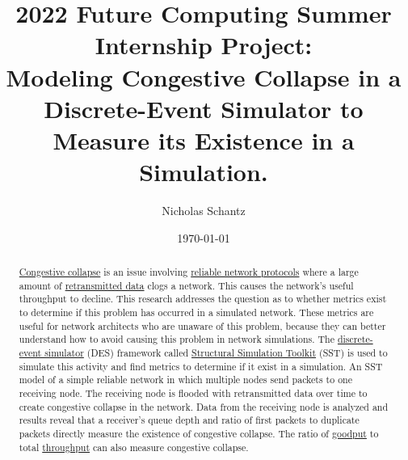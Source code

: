 \documentclass{article}
\begin{document}
    \begin{minipage}[h]{\textwidth}
        \title{2022 Future Computing Summer Internship Project:\\Modeling Congestive Collapse in a Discrete-Event Simulator to Measure its Existence in a Simulation.}
        \author{Nicholas Schantz}
        \date{\today}
            \maketitle
        \begin{abstract}
            \href{https://en.wikipedia.org/wiki/Network_congestion#Congestive_collapse}{Congestive collapse} is an issue involving \href{https://en.wikipedia.org/wiki/Reliability_(computer_networking}{reliable network protocols} where a large amount of \href{https://www.javatpoint.com/tcp-retransmission}{retransmitted data} clogs a network. This causes the network's useful throughput to decline. This research addresses the question as to whether metrics exist to determine if this problem has occurred in a simulated network. These metrics are useful for network architects who are unaware of this problem, because they can better understand how to avoid causing this problem in network simulations. The \href{https://en.wikipedia.org/wiki/Discrete-event_simulation}{discrete-event simulator} (DES) framework called \href{http://sst-simulator.org/}{Structural Simulation Toolkit} (SST) is used to simulate this activity and find metrics to determine if it exist in a simulation. An SST model of a simple reliable network in which multiple nodes send packets to one receiving node. The receiving node is flooded with retransmitted data over time to create congestive collapse in the network. Data from the receiving node is analyzed and results reveal that a receiver's queue depth and ratio of first packets to duplicate packets directly measure the existence of congestive collapse. The ratio of \href{https://en.wikipedia.org/wiki/Goodput}{goodput} to total \href{https://en.wikipedia.org/wiki/Network_throughput}{throughput} can also measure congestive collapse.
        \end{abstract}
    \end{minipage}

\ \\

\end{document}
